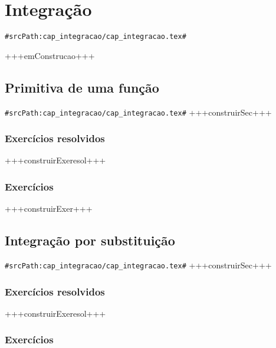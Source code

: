 
\chapter{Integração}
\verb+#srcPath:cap_integracao/cap_integracao.tex#+
\label{cap:integracao}

+++emConstrucao+++

\section{Primitiva de uma função}
\verb+#srcPath:cap_integracao/cap_integracao.tex#+
+++construirSec+++
\subsection*{Exercícios resolvidos}

+++construirExeresol+++


\subsection*{Exercícios}

+++construirExer+++


\section{Integração por substituição}
\verb+#srcPath:cap_integracao/cap_integracao.tex#+
+++construirSec+++

\subsection*{Exercícios resolvidos}

+++construirExeresol+++


\subsection*{Exercícios}

